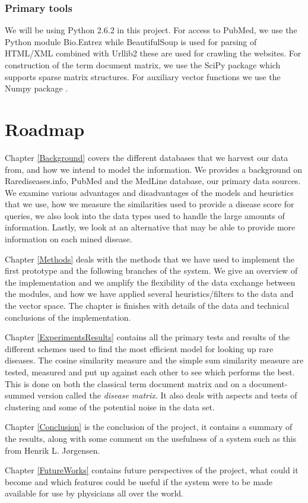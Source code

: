 
\subsubsection{Primary tools}
We will be using Python 2.6.2 \cite{PythonLanguage} in this project. For access to PubMed, we use
the Python module Bio.Entrez \cite{EntrezProgUtil} while BeautifulSoup
\cite{BS} is used for parsing of HTML/XML combined with Urllib2
\cite{UL2} these are used for crawling the websites. For construction
of the term document matrix, we use the SciPy package \cite{SciPy}
which supports sparse matrix structures. For auxiliary vector
functions we use the Numpy package \cite{NumPy}.

\section{Roadmap}

Chapter \ref{Background} covers the different databases that we
harvest our data from, and how we intend to model the
information. We provides a background on Rarediseases.info, PubMed and
the MedLine database, our primary data sources. We examine various
advantages and disadvantages of the models and heuristics that we use,
how we measure the similarities used to provide a disease score for
queries, we also look into the data types used to handle the large
amounts of information. Lastly, we look at an alternative that may
be able to provide more information on each mined disease.

Chapter \ref{Methods} deals with the methods that we have used to
implement the first prototype and the following branches of the
system. We give an overview of the implementation and we amplify the
flexibility of the data exchange between the modules, and how we have
applied several heuristics/filters to the data and the vector
space. The chapter is  finishes
with details of the data and technical conclusions of the
implementation.

Chapter \ref{ExperimentsResults} contains all the primary tests and
results of the different schemes used to find the most efficient model
for looking up rare diseases. The cosine similarity measure and the
simple sum similarity measure are tested, measured and put up against
each other to see which performs the best. This is done on both the
classical term document matrix and on a document-summed version called
the \textit{disease matrix}. It also deals with aspects and tests of
clustering and some of the potential noise in the data set.

Chapter \ref{Conclusion} is the conclusion of the project, it contains
a summary of the results, along with some comment on the usefulness of
a system such as this from Henrik L. J\o rgensen.


Chapter \ref{FutureWorks} contains future perspectives of the project,
what could it become and which features could be useful if the system
were to be made available for use by physicians all over the world.

